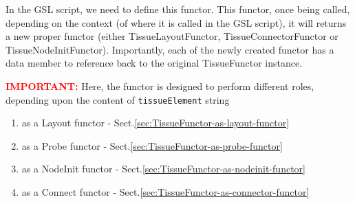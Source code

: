 In the GSL script, we need to define this functor.
This functor, once being called, depending on the context (of where it
is called in the GSL script), it will returns a new proper functor (either
TissueLayoutFunctor, TissueConnectorFunctor or TissueNodeInitFunctor). 
Importantly, each of the newly created functor has a data member to reference
back to the original TissueFunctor instance.



%                                                                                                               
%               
%                                                                                                               

\textcolor{red}{\bf IMPORTANT:} Here, the functor is designed to perform
different roles, depending upon the content of \verb!tissueElement! string 
\begin{enumerate}
  \item as a Layout functor - Sect.\ref{sec:TissueFunctor-as-layout-functor}
  \item as a Probe functor - Sect.\ref{sec:TissueFunctor-as-probe-functor}
  \item as a NodeInit functor - Sect.\ref{sec:TissueFunctor-as-nodeinit-functor}
  \item as a Connect functor -
  Sect.\ref{sec:TissueFunctor-as-connector-functor}
\end{enumerate}

